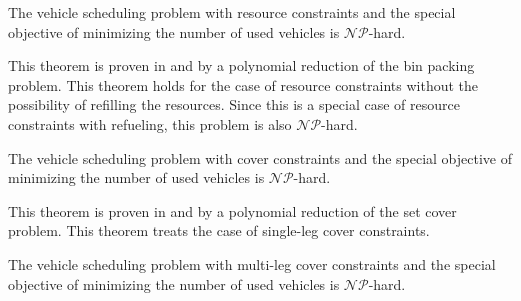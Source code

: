 \begin{theorem}
\label{th:complexity_VSPRC}

The vehicle scheduling problem with resource constraints and the special objective of minimizing the number of used vehicles is $\mathcal{NP}$-hard.

\end{theorem}

This theorem is proven in \cite[p.~11]{Kaiser} and\cite[p.~11]{Knoll} by a polynomial reduction of the bin packing problem. This theorem holds for the case of resource constraints without the possibility of refilling the resources. Since this is a special case of resource constraints with refueling, this problem is also $\mathcal{NP}$-hard. 

\begin{theorem}
\label{th:complexity_VSPSC}

The vehicle scheduling problem with cover constraints and the special objective of minimizing the number of used vehicles is $\mathcal{NP}$-hard.

\end{theorem}

This theorem is proven in \cite[p.~12]{Kaiser} and \cite[p.~12]{Knoll} by a polynomial reduction of the set cover problem. This theorem treats the case of single-leg cover constraints.

\begin{theorem}
\label{th:complexity_VSPMC}

The vehicle scheduling problem with multi-leg cover constraints and the special objective of minimizing the number of used vehicles is $\mathcal{NP}$-hard.

\end{theorem}


